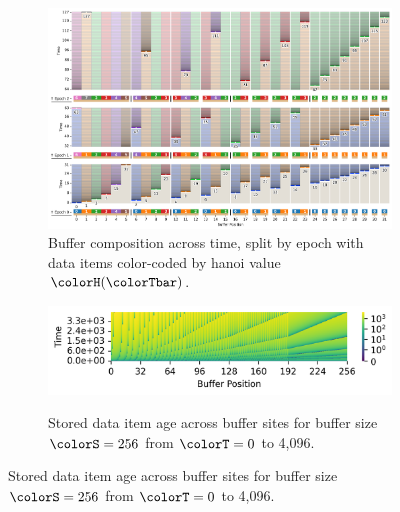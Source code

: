 \begin{figure}[htbp!]
\begin{subfigure}[b]{\linewidth}
\includegraphics[width=\linewidth]{
binder/teeplots/12/num-generations=128+reservation-mode=steady-full+surface-size=32+viz=site-reservation-by-rank-spliced-at-heatmap+ext=.png}
\vspace{-4.5ex}\caption{\footnotesize
  Buffer composition across time, split by epoch with data items color-coded by hanoi value $\colorH(\colorTbar)$.
}
\label{fig:hsurf-steady-implementation-schematic}
\end{subfigure}

\vspace{0.5ex}
\begin{minipage}[]{\textwidth}
 \vspace{-2pt}
  \begin{subfigure}[t]{0.65\linewidth}
    \vspace{0pt}
    \centering
  \includegraphics[width=0.88\linewidth,clip]{binder/teeplots/12/cnorm=log+num-generations=4096+surface-size=256+viz=site-ingest-depth-by-rank-heatmap+ynorm=linear+ext=.png}  %
  \end{subfigure}%
  \begin{subfigure}[t]{0.35\linewidth}
  \vspace{-2pt}
  \caption{%
    \footnotesize
    Stored data item age across buffer sites for buffer size $\colorS=256$ from $\colorT=0$ to 4,096.
  }
  \label{fig:hsurf-steady-implementation-heatmap}
\end{subfigure}
\end{minipage}


\end{figure}
